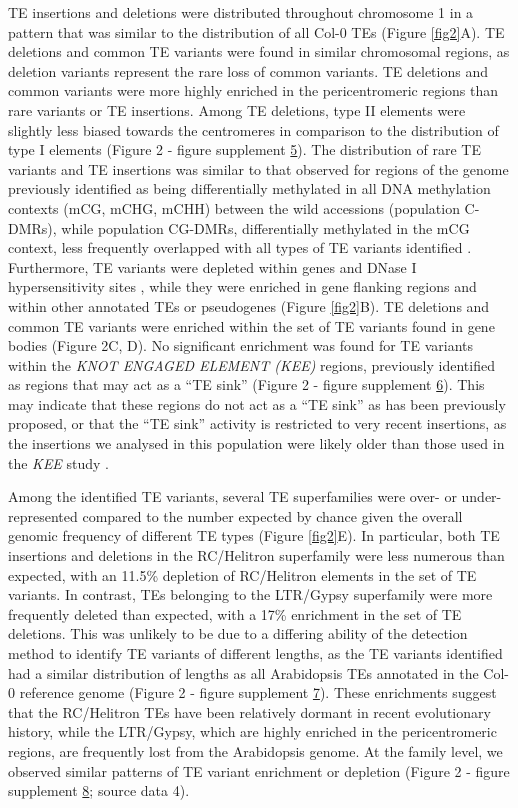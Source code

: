 \documentclass[12pt]{article}
\begin{document}
TE insertions and deletions were distributed throughout chromosome 1
in a pattern that was similar to the distribution of all Col-0 TEs
(Figure \ref{fig2}A). TE deletions and common TE variants were found
in similar chromosomal regions, as deletion variants represent the
rare loss of common variants. TE deletions and common variants were
more highly enriched in the pericentromeric regions than rare variants
or TE insertions. Among TE deletions, type II elements were slightly
less biased towards the centromeres in comparison to the distribution
of type I elements (Figure 2 - figure supplement
\hyperref[fig2s5]{5}). The distribution of rare TE variants and TE
insertions was similar to that observed for regions of the genome
previously identified as being differentially methylated in all DNA
methylation contexts (mCG, mCHG, mCHH) between the wild accessions
(population C-DMRs), while population CG-DMRs, differentially
methylated in the mCG context, less frequently overlapped with all
types of TE variants identified \cite{Schmitz:2013iu}. Furthermore, TE
variants were depleted within genes and DNase I hypersensitivity sites
\cite{Sullivan:2014ii}, while they were enriched in gene flanking
regions and within other annotated TEs or pseudogenes (Figure
\ref{fig2}B). TE deletions and common TE variants were enriched within
the set of TE variants found in gene bodies (Figure 2C, D). No
significant enrichment was found for TE variants within the \emph{KNOT
  ENGAGED ELEMENT (KEE) }regions, previously identified as regions
that may act as a ``TE sink'' \cite{Grob:2014kg} (Figure 2 - figure
supplement \hyperref[fig2s6]{6}). This may indicate that these regions
do not act as a ``TE sink'' as has been previously proposed, or that
the ``TE sink'' activity is restricted to very recent insertions, as
the insertions we analysed in this population were likely older than
those used in the \emph{KEE} study \cite{Grob:2014kg}.

Among the identified TE variants, several TE superfamilies were over-
or under-represented compared to the number expected by chance given
the overall genomic frequency of different TE types (Figure
\ref{fig2}E). In particular, both TE insertions and deletions in the
RC/Helitron superfamily were less numerous than expected, with an
11.5\% depletion of RC/Helitron elements in the set of TE variants. In
contrast, TEs belonging to the LTR/Gypsy superfamily were more
frequently deleted than expected, with a 17\% enrichment in the set of
TE deletions. This was unlikely to be due to a differing ability of
the detection method to identify TE variants of different lengths, as
the TE variants identified had a similar distribution of lengths as
all Arabidopsis TEs annotated in the Col-0 reference genome (Figure 2
- figure supplement \hyperref[fig2s7]{7}). These enrichments suggest
that the RC/Helitron TEs have been relatively dormant in recent
evolutionary history, while the LTR/Gypsy, which are highly enriched
in the pericentromeric regions, are frequently lost from the
Arabidopsis genome. At the family level, we observed similar patterns
of TE variant enrichment or depletion (Figure 2 - figure supplement
\hyperref[fig2s8]{8}; source data 4).
\end{document}
